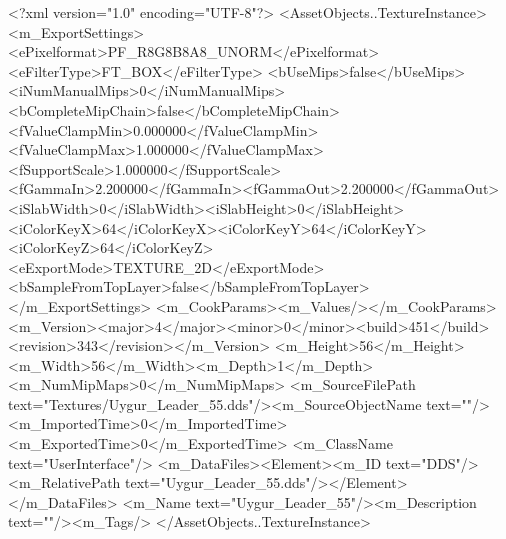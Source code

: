 <?xml version="1.0" encoding="UTF-8"?>
<AssetObjects..TextureInstance>
  <m_ExportSettings>
    <ePixelformat>PF_R8G8B8A8_UNORM</ePixelformat><eFilterType>FT_BOX</eFilterType>
    <bUseMips>false</bUseMips><iNumManualMips>0</iNumManualMips><bCompleteMipChain>false</bCompleteMipChain>
    <fValueClampMin>0.000000</fValueClampMin><fValueClampMax>1.000000</fValueClampMax><fSupportScale>1.000000</fSupportScale>
    <fGammaIn>2.200000</fGammaIn><fGammaOut>2.200000</fGammaOut><iSlabWidth>0</iSlabWidth><iSlabHeight>0</iSlabHeight>
    <iColorKeyX>64</iColorKeyX><iColorKeyY>64</iColorKeyY><iColorKeyZ>64</iColorKeyZ>
    <eExportMode>TEXTURE_2D</eExportMode><bSampleFromTopLayer>false</bSampleFromTopLayer>
  </m_ExportSettings>
  <m_CookParams><m_Values/></m_CookParams>
  <m_Version><major>4</major><minor>0</minor><build>451</build><revision>343</revision></m_Version>
  <m_Height>56</m_Height><m_Width>56</m_Width><m_Depth>1</m_Depth><m_NumMipMaps>0</m_NumMipMaps>
  <m_SourceFilePath text="Textures/Uygur_Leader_55.dds"/><m_SourceObjectName text=""/>
  <m_ImportedTime>0</m_ImportedTime><m_ExportedTime>0</m_ExportedTime>
  <m_ClassName text="UserInterface"/>
  <m_DataFiles><Element><m_ID text="DDS"/><m_RelativePath text="Uygur_Leader_55.dds"/></Element></m_DataFiles>
  <m_Name text="Uygur_Leader_55"/><m_Description text=""/><m_Tags/>
</AssetObjects..TextureInstance>
